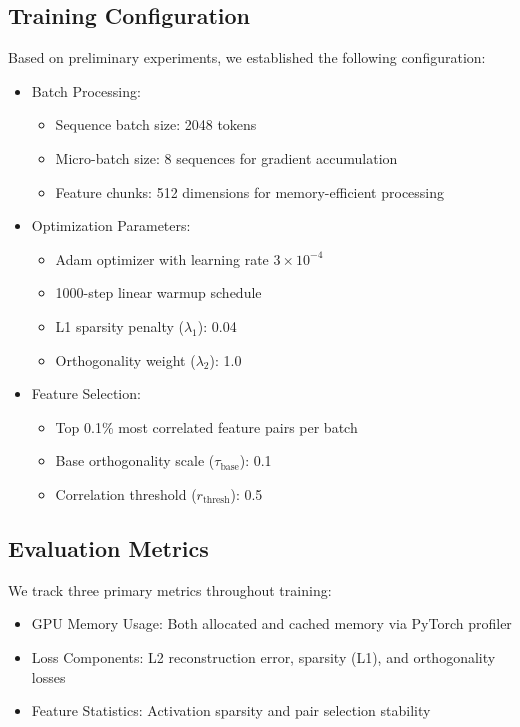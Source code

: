 \documentclass{article} %
\begin{document}
\subsection{Training Configuration}
Based on preliminary experiments, we established the following configuration:

\begin{itemize}
    \item Batch Processing:
    \begin{itemize}
        \item Sequence batch size: 2048 tokens
        \item Micro-batch size: 8 sequences for gradient accumulation
        \item Feature chunks: 512 dimensions for memory-efficient processing
    \end{itemize}
    
    \item Optimization Parameters:
    \begin{itemize}
        \item Adam optimizer with learning rate $3 \times 10^{-4}$
        \item 1000-step linear warmup schedule
        \item L1 sparsity penalty ($\lambda_1$): 0.04
        \item Orthogonality weight ($\lambda_2$): 1.0
    \end{itemize}
    
    \item Feature Selection:
    \begin{itemize}
        \item Top 0.1\% most correlated feature pairs per batch
        \item Base orthogonality scale ($\tau_{\text{base}}$): 0.1
        \item Correlation threshold ($r_{\text{thresh}}$): 0.5
    \end{itemize}
\end{itemize}

\subsection{Evaluation Metrics}
We track three primary metrics throughout training:
\begin{itemize}
    \item GPU Memory Usage: Both allocated and cached memory via PyTorch profiler
    \item Loss Components: L2 reconstruction error, sparsity (L1), and orthogonality losses
    \item Feature Statistics: Activation sparsity and pair selection stability
\end{itemize}
\end{document}
